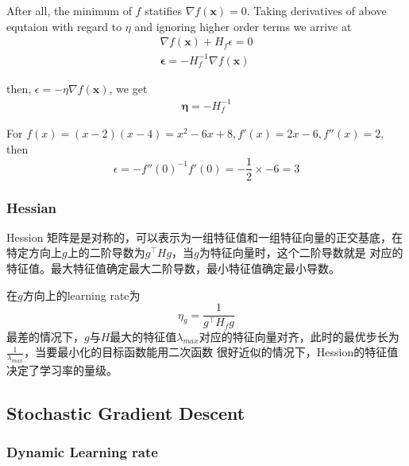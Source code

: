 \par

After all, the minimum of $f$ statifies $\nabla f(\mathbf{x}) = 0$.  Taking derivatives of above equtaion with regard to $\eta$ and 
ignoring higher order terms we arrive at 
\begin{equation}
   \begin{split}
    \nabla f(\mathbf{x}) + H_f \epsilon = 0 \\
    \mathbf{\epsilon} = -H_f^{-1} \nabla f(\mathbf{x})
   \end{split}
\end{equation}

then, $\epsilon = -\eta \nabla f(\mathbf{x})$, we get
\begin{equation}
    \begin{split}
        \mathbf{\eta} = -H_f^{-1}
    \end{split}
\end{equation}

For $f(x) = (x-2)(x-4) = x^2 - 6x + 8, f'(x) = 2x - 6, f''(x) = 2$, then
\begin{equation}
    \epsilon = -f''(0)^{-1} f'(0) = -\frac{1}{2} \times -6 = 3 
\end{equation}

\subsubsection{Hessian}
Hession 矩阵是是对称的，可以表示为一组特征值和一组特征向量的正交基底，在特定方向上$g$上的二阶导数为$g^\top H g$，当$g$为特征向量时，这个二阶导数就是
对应的特征值。最大特征值确定最大二阶导数，最小特征值确定最小导数。\par
在$g$方向上的learning rate为
\begin{equation}
    \eta_g = \frac{1}{g^\top H_f g}
\end{equation}
最差的情况下，$g$与$H$最大的特征值$\lambda_{max}$对应的特征向量对齐，此时的最优步长为$\frac{1}{\lambda_{max}}$，当要最小化的目标函数能用二次函数
很好近似的情况下，Hession的特征值决定了学习率的量级。

\subsection{Stochastic Gradient Descent}
\subsubsection{Dynamic Learning rate}

